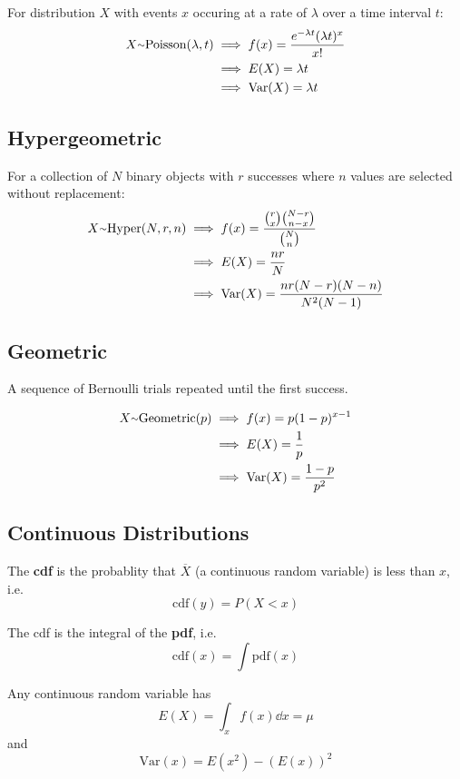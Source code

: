 \documentclass[12pt]{article}
\begin{document}
For distribution $X$ with events $x$ occuring at a rate of $\lambda$ over a time interval $t$:
\begin{align*}
X \ttilde \text{Poisson}(\lambda, t) &\implies f(x) = \frac{e^{-\lambda t} (\lambda t)^x}{x!}\\
                                     &\implies E(X) = \lambda t\\
                                     &\implies \text{Var}(X) = \lambda t
\end{align*}

\subsection*{Hypergeometric}
For a collection of $N$ binary objects with $r$ successes where $n$ values are selected without replacement:
\begin{align*}
X \ttilde \text{Hyper}(N, r, n) &\implies f(x) = \frac{{r \choose x} {N-r \choose n-x}}{{N \choose n}}\\
                                &\implies E(X) = \frac{nr}{N}\\
                                &\implies \text{Var}(X) = \frac{nr(N-r)(N-n)}{N^2(N-1)}
\end{align*}

\subsection*{Geometric}
A sequence of Bernoulli trials repeated until the first success.

\begin{align*}
X \ttilde \text{Geometric}(p) &\implies f(x) = p(1-p)^{x-1}\\
                              &\implies E(X) = \frac{1}{p}\\
                              &\implies \text{Var}(X) = \frac{1-p}{p^2}
\end{align*}

\subsection*{Continuous Distributions}
The {\bf cdf} is the probablity that $\overline{X}$ (a continuous random variable) is less than $x$, i.e. \[ \text{cdf}(y) = P(X < x) \]

The cdf is the integral of the {\bf pdf}, i.e. \[ \text{cdf}(x) = \int{\text{pdf}(x)} \]

Any continuous random variable has \[ E(X) = \int_x f(x) \dd x = \mu \] and \[ \text{Var}(x) = E(x^2) - (E(x))^2 \]
\end{document}
